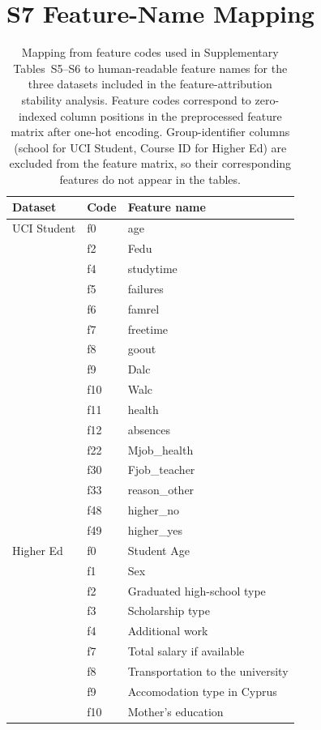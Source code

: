 \documentclass[10pt,letterpaper]{article}
\begin{document}
\clearpage
\section*{S7 Feature-Name Mapping}

\begin{table}[H]
\centering
\caption{Mapping from feature codes used in Supplementary Tables~S5--S6 to human-readable feature names for the three datasets included in the feature-attribution stability analysis. Feature codes correspond to zero-indexed column positions in the preprocessed feature matrix after one-hot encoding. Group-identifier columns (school for UCI Student, Course ID for Higher Ed) are excluded from the feature matrix, so their corresponding features do not appear in the tables.}
\label{tab:feature_mapping}
\small
\begin{tabular}{l l l}
\toprule
Dataset & Code & Feature name \\
\midrule
UCI Student & f0 & age \\
 & f2 & Fedu \\
 & f4 & studytime \\
 & f5 & failures \\
 & f6 & famrel \\
 & f7 & freetime \\
 & f8 & goout \\
 & f9 & Dalc \\
 & f10 & Walc \\
 & f11 & health \\
 & f12 & absences \\
 & f22 & Mjob\_health \\
 & f30 & Fjob\_teacher \\
 & f33 & reason\_other \\
 & f48 & higher\_no \\
 & f49 & higher\_yes \\
\midrule
Higher Ed & f0 & Student Age \\
 & f1 & Sex \\
 & f2 & Graduated high-school type \\
 & f3 & Scholarship type \\
 & f4 & Additional work \\
 & f7 & Total salary if available \\
 & f8 & Transportation to the university \\
 & f9 & Accomodation type in Cyprus \\
 & f10 & Mother's education \\

\end{tabular}
\end{table}
\end{document}
